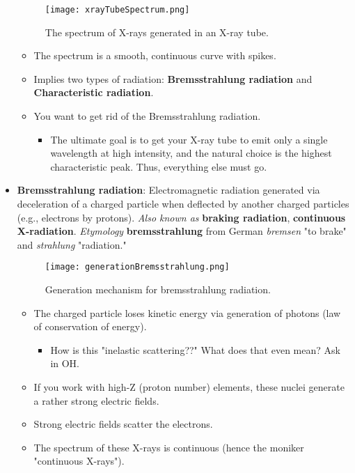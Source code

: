 \documentclass[../notes.tex]{subfiles}
\begin{document}
\begin{itemize}
\begin{figure}[H]
        \texttt{[image: xrayTubeSpectrum.png]}
        \caption{The spectrum of X-rays generated in an X-ray tube.}
        \label{fig:xrayTubeSpectrum}
    \end{figure}
    \begin{itemize}
        \item The spectrum is a smooth, continuous curve with spikes.
        \item Implies two types of radiation: \textbf{Bremsstrahlung radiation} and \textbf{Characteristic radiation}.
        \item You want to get rid of the Bremsstrahlung radiation.
        \begin{itemize}
            \item The ultimate goal is to get your X-ray tube to emit only a single wavelength at high intensity, and the natural choice is the highest characteristic peak. Thus, everything else must go.
        \end{itemize}
    \end{itemize}
    \item \textbf{Bremsstrahlung radiation}: Electromagnetic radiation generated via deceleration of a charged particle when deflected by another charged particles (e.g., electrons by protons). \emph{Also known as} \textbf{braking radiation}, \textbf{continuous X-radiation}. \emph{Etymology} \textbf{bremsstrahlung} from German \emph{bremsen} "to brake" and \emph{strahlung} "radiation."
    \begin{figure}[h!]
        \centering
        \texttt{[image: generationBremsstrahlung.png]}
        \caption{Generation mechanism for bremsstrahlung radiation.}
        \label{fig:generationBremsstrahlung}
    \end{figure}
    \begin{itemize}
        \item The charged particle loses kinetic energy via generation of photons (law of conservation of energy).
        \begin{itemize}
            \item How is this "inelastic scattering??" What does that even mean? Ask in OH.
        \end{itemize}
        \item If you work with high-Z (proton number) elements, these nuclei generate a rather strong electric fields.
        \item Strong electric fields scatter the electrons.
        \item The spectrum of these X-rays is continuous (hence the moniker "continuous X-rays").

\end{itemize}
\end{itemize}
\end{document}
